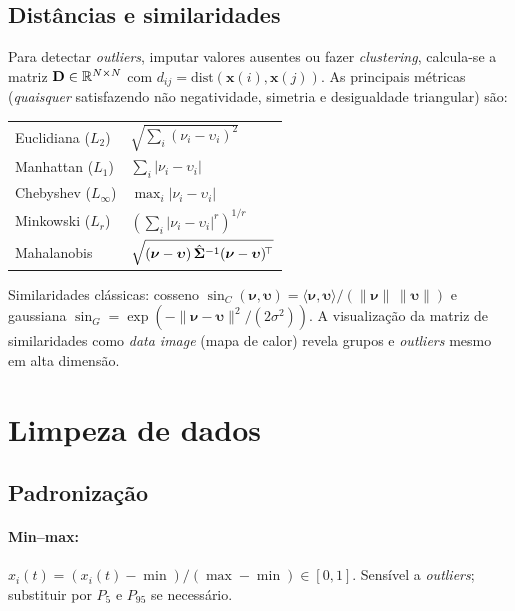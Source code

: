 \subsection{Distâncias e similaridades}

Para detectar \emph{outliers}, imputar valores ausentes ou fazer
\emph{clustering}, calcula-se a matriz $\mathbf{D}\in\mathbb{R}^{N\times N}$
com $d_{ij}=\mathrm{dist}(\mathbf{x}(i),\mathbf{x}(j))$. As principais
métricas (\emph{quaisquer} satisfazendo não negatividade, simetria e
desigualdade triangular) são:

\begin{center}\small
\begin{tabular}{@{}l l@{}}
\toprule
Euclidiana ($L_2$) & $\sqrt{\sum_i (\nu_i-\upsilon_i)^2}$ \\
Manhattan ($L_1$) & $\sum_i |\nu_i-\upsilon_i|$ \\
Chebyshev ($L_\infty$) & $\max_i |\nu_i-\upsilon_i|$ \\
Minkowski ($L_r$) & $(\sum_i |\nu_i-\upsilon_i|^r)^{1/r}$ \\
Mahalanobis & $\sqrt{(\boldsymbol\nu-\boldsymbol\upsilon)\,
                     \hat{\boldsymbol{\Sigma}}^{-1}
                     (\boldsymbol\nu-\boldsymbol\upsilon)^{\!\top}}$ \\
\bottomrule
\end{tabular}
\end{center}

Similaridades clássicas: cosseno
$\sin_C(\boldsymbol\nu,\boldsymbol\upsilon)=
\langle\boldsymbol\nu,\boldsymbol\upsilon\rangle/
(\|\boldsymbol\nu\|\,\|\boldsymbol\upsilon\|)$ e gaussiana
$\sin_G=\exp(-\|\boldsymbol\nu-\boldsymbol\upsilon\|^2/(2\sigma^2))$. A
visualização da matriz de similaridades como \emph{data image} (mapa de
calor) revela grupos e \emph{outliers} mesmo em alta dimensão.

\section{Limpeza de dados}

\subsection{Padronização}

\paragraph{Min--max:} $\hat{x}_i(t)=(x_i(t)-\min)/(\max-\min)\in[0,1]$.
Sensível a \emph{outliers}; substituir por $P_5$ e $P_{95}$ se
necessário.

